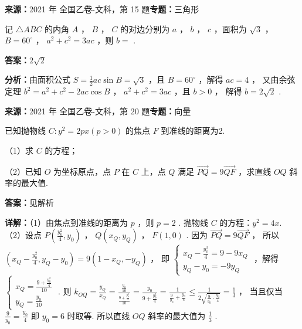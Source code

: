 \begin{question}[points=5]
\textbf{来源：}2021 年 全国乙卷-文科，第 15 题\quad \textbf{专题：}三角形\par
记 $\triangle ABC$ 的内角 $A$ ， $B$ ， $C$ 的对边分别为 $a$ ， $b$ ， $c$ ，面积为 $\sqrt{3}$ ， $B = 60^\circ$ ， $a^2 + c^2 = 3ac$ ，则 $b =$ .
\fillin[{$2\sqrt{2}$}]
\begin{solution}
\textbf{答案：}$2\sqrt{2}$

\textbf{分析：}由面积公式 $S = \frac{1}{2}ac\sin B = \sqrt{3}$ ，且 $B = 60^\circ$ ，解得 $ac = 4$ ，
又由余弦定理 $b^2 = a^2 + c^2 - 2ac\cos B$ ， $a^2 + c^2 = 3ac$ ，且 $b > 0$ ，
解得 $b = 2\sqrt{2}$ .
\end{solution}
\end{question}

\begin{question}[points=12]
\textbf{来源：}2021 年 全国乙卷-文科，第 20 题\quad \textbf{专题：}向量\par
已知抛物线 $C: y^2 = 2px (p>0)$ 的焦点 $F$ 到准线的距离为2.

（1）求 $C$ 的方程；

（2）已知 $O$ 为坐标原点，点 $P$ 在 $C$ 上，点 $Q$ 满足 $\overrightarrow{PQ} = 9\overrightarrow{QF}$ ，求直线 $OQ$ 斜率的最大值.
\begin{solution}
\textbf{答案：}见解析

\textbf{详解：}（1）由焦点到准线的距离为 $p$ ，则 $p = 2$ .
抛物线 $C$ 的方程：$y^2 = 4x$.
（2）设点 $P\left(\frac{y_0^2}{4}, y_0\right)$ ， $Q(x_Q, y_Q)$ ， $F(1,0)$ .
因为 $\overrightarrow{PQ} = 9\overrightarrow{QF}$ ，
所以 $(x_Q - \frac{y_0^2}{4}, y_Q - y_0) = 9(1-x_Q, -y_Q)$ ，
即 $\begin{cases} x_Q - \frac{y_0^2}{4} = 9 - 9x_Q \\ y_Q - y_0 = -9y_Q \end{cases}$ ，解得 $\begin{cases} x_Q = \frac{9 + \frac{y_0^2}{4}}{10} \\ y_Q = \frac{y_0}{10} \end{cases}$ .
则 $k_{OQ} = \frac{y_Q}{x_Q} = \frac{\frac{y_0}{10}}{\frac{9 + \frac{y_0^2}{4}}{10}} = \frac{y_0}{9 + \frac{y_0^2}{4}} = \frac{1}{\frac{9}{y_0} + \frac{y_0}{4}} \le \frac{1}{2\sqrt{\frac{9}{y_0}\cdot\frac{y_0}{4}}} = \frac{1}{3}$ ，
当且仅当 $\frac{9}{y_0} = \frac{y_0}{4}$ 即 $y_0 = 6$ 时取等.
所以直线 $OQ$ 斜率的最大值为 $\frac{1}{3}$ .
\end{solution}
\end{question}

